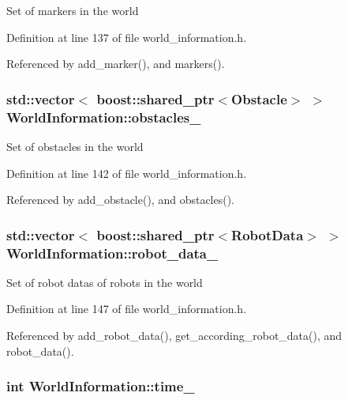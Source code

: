 Set of markers in the world 

Definition at line 137 of file world\_\-information.h.

Referenced by add\_\-marker(), and markers().\hypertarget{class_world_information_0c5a0ac3fe3570a87495d5dd8c925e27}{
\subsubsection[obstacles\_\-]{\setlength{\rightskip}{0pt plus 5cm}std::vector$<$ boost::shared\_\-ptr$<$Obstacle$>$ $>$ {\bf WorldInformation::obstacles\_\-}}}
\label{class_world_information_0c5a0ac3fe3570a87495d5dd8c925e27}


Set of obstacles in the world 

Definition at line 142 of file world\_\-information.h.

Referenced by add\_\-obstacle(), and obstacles().\hypertarget{class_world_information_118f01f046eda522ff0b86bc3d5a712d}{
\subsubsection[robot\_\-data\_\-]{\setlength{\rightskip}{0pt plus 5cm}std::vector$<$ boost::shared\_\-ptr$<${\bf RobotData}$>$ $>$ {\bf WorldInformation::robot\_\-data\_\-}}}
\label{class_world_information_118f01f046eda522ff0b86bc3d5a712d}


Set of robot datas of robots in the world 

Definition at line 147 of file world\_\-information.h.

Referenced by add\_\-robot\_\-data(), get\_\-according\_\-robot\_\-data(), and robot\_\-data().\hypertarget{class_world_information_540835d7e7a2311dd77a405655f0bdb4}{
\subsubsection[time\_\-]{\setlength{\rightskip}{0pt plus 5cm}int {\bf WorldInformation::time\_\-}}}
\label{class_world_information_540835d7e7a2311dd77a405655f0bdb4}


